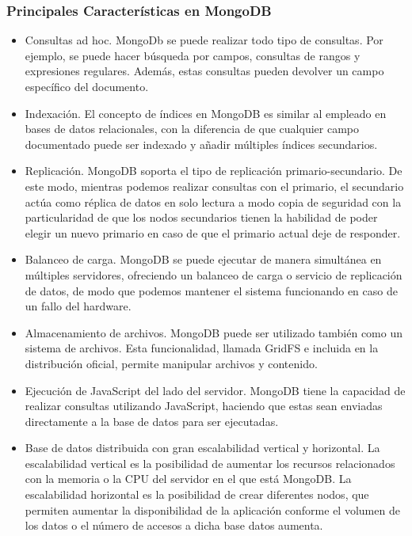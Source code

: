 \documentclass[twoside,twocolumn]{article}
\begin{document}
\subsubsection{Principales Características en MongoDB}
\begin{itemize}
    \item   Consultas ad hoc. MongoDb se puede realizar todo tipo de consultas. Por ejemplo, se puede hacer búsqueda por campos, consultas de rangos y expresiones regulares. Además, estas consultas pueden devolver un campo específico del documento.
    \item	Indexación. El concepto de índices en MongoDB es similar al empleado en bases de datos relacionales, con la diferencia de que cualquier campo documentado puede ser indexado y añadir múltiples índices secundarios.
    \item	Replicación. MongoDB soporta el tipo de replicación primario-secundario. De este modo, mientras podemos realizar consultas con el primario, el secundario actúa como réplica de datos en solo lectura a modo copia de seguridad con la particularidad de que los nodos secundarios tienen la habilidad de poder elegir un nuevo primario en caso de que el primario actual deje de responder.
    \item	Balanceo de carga. MongoDB se puede ejecutar de manera simultánea en múltiples servidores, ofreciendo un balanceo de carga o servicio de replicación de datos, de modo que podemos mantener el sistema funcionando en caso de un fallo del hardware.
    \item	Almacenamiento de archivos. MongoDB puede ser utilizado también como un sistema de archivos. Esta funcionalidad, llamada GridFS e incluida en la distribución oficial, permite manipular archivos y contenido.
    \item	Ejecución de JavaScript del lado del servidor. MongoDB tiene la capacidad de realizar consultas utilizando JavaScript, haciendo que estas sean enviadas directamente a la base de datos para ser ejecutadas.
    \item	Base de datos distribuida con gran escalabilidad vertical y horizontal. La escalabilidad vertical es la posibilidad de aumentar los recursos relacionados con la memoria o la CPU del servidor en el que está MongoDB. La escalabilidad horizontal es la posibilidad de crear diferentes nodos, que permiten aumentar la disponibilidad de la aplicación conforme el volumen de los datos o el número de accesos a dicha base datos aumenta.
    
\end{itemize}
\end{document}
